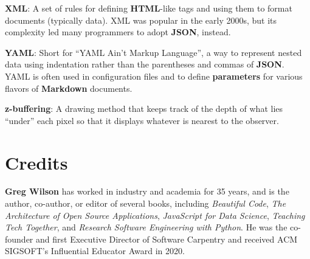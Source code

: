 \documentclass[krantzl]{krantz}
\newcommand{\glosskey}[1]{\textbf{#1}}
\begin{document}
\noindent \textbf{{\newline}\glosskey{XML}}: 
A set of rules for defining \glosskey{HTML}-like tags and using them to format documents (typically data). XML was popular in the early 2000s, but its complexity led many programmers to adopt \glosskey{JSON}, instead.


\noindent \textbf{{\newline}\glosskey{YAML}}: 
Short for “YAML Ain’t Markup Language”, a way to represent nested data using indentation rather than the parentheses and commas of \glosskey{JSON}. YAML is often used in configuration files and to define \glosskey{parameters} for various flavors of \glosskey{Markdown} documents.


\noindent \textbf{{\newline}\glosskey{z-buffering}}: 
A drawing method that keeps track of the depth of what lies “under” each pixel so that it displays whatever is nearest to the observer.




\chapter{Credits}\label{credits}

\textbf{Greg Wilson} has worked in industry and academia for 35 years, and is the author, co-author, or editor of several books, including \emph{Beautiful Code}, \emph{The Architecture of Open Source Applications}, \emph{JavaScript for Data Science}, \emph{Teaching Tech Together}, and \emph{Research Software Engineering with Python}. He was the co-founder and first Executive Director of Software Carpentry and received ACM SIGSOFT’s Influential Educator Award in 2020.


\cleardoublepage
\makeatletter
\renewcommand{\tocetcmark}[1]{%
  \@mkboth{{#1}}{{#1}}}
  \makeatother
\printindex
\end{document}
